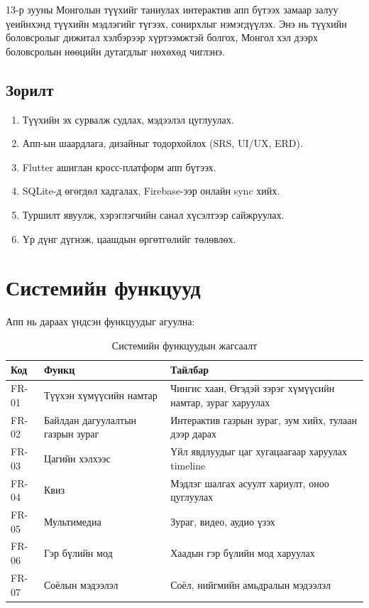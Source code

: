 	13-р зууны Монголын түүхийг таниулах интерактив апп бүтээх замаар залуу үеийнхэнд түүхийн мэдлэгийг түгээх, сонирхлыг нэмэгдүүлэх. Энэ нь түүхийн боловсролыг дижитал хэлбэрээр хүртээмжтэй болгох, Монгол хэл дээрх боловсролын нөөцийн дутагдлыг нөхөхөд чиглэнэ.
	
	\newpage
	\subsection*{Зорилт}
	
	\begin{enumerate}
		\item Түүхийн эх сурвалж судлах, мэдээлэл цуглуулах.
		\item Апп-ын шаардлага, дизайныг тодорхойлох (SRS, UI/UX, ERD).
		\item Flutter ашиглан кросс-платформ апп бүтээх.
		\item SQLite-д өгөгдөл хадгалах, Firebase-ээр онлайн sync хийх.
		\item Туршилт явуулж, хэрэглэгчийн санал хүсэлтээр сайжруулах.
		\item Үр дүнг дүгнэж, цаашдын өргөтгөлийг төлөвлөх.
	\end{enumerate}

	\section{Системийн функцууд}
	
	Апп нь дараах үндсэн функцуудыг агуулна:
	
	\begin{table}[h]
	\centering
	\begin{tabular}{|p{1.5cm}|p{5cm}|p{7cm}|}
	\hline
	\textbf{Код} & \textbf{Функц} & \textbf{Тайлбар} \\
	\hline
	FR-01 & Түүхэн хүмүүсийн намтар & Чингис хаан, Өгэдэй зэрэг хүмүүсийн намтар, зураг харуулах \\
	\hline
	FR-02 & Байлдан дагуулалтын газрын зураг & Интерактив газрын зураг, зум хийх, тулаан дээр дарах \\
	\hline
	FR-03 & Цагийн хэлхээс & Үйл явдлуудыг цаг хугацаагаар харуулах timeline \\
	\hline
	FR-04 & Квиз & Мэдлэг шалгах асуулт хариулт, оноо цуглуулах \\
	\hline
	FR-05 & Мультимедиа & Зураг, видео, аудио үзэх \\
	\hline
	FR-06 & Гэр бүлийн мод & Хаадын гэр бүлийн мод харуулах \\
	\hline
	FR-07 & Соёлын мэдээлэл & Соёл, нийгмийн амьдралын мэдээлэл \\
	\hline
	\end{tabular}
	\caption{Системийн функцуудын жагсаалт}
	\label{tab:functions}
	\end{table}

